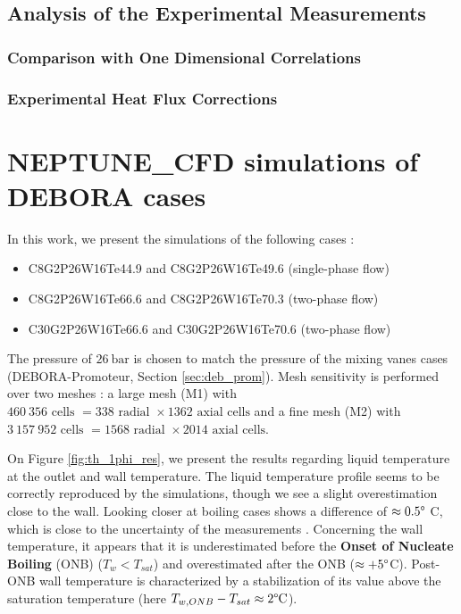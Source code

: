 \section{Analysis of the Experimental Measurements}

\subsection{Comparison with One Dimensional Correlations}

\subsection{Experimental Heat Flux Corrections}

\chapter{NEPTUNE\_CFD simulations of DEBORA cases}

In this work, we present the simulations of the following cases :
\begin{itemize}
\item C8G2P26W16Te44.9 and C8G2P26W16Te49.6 (single-phase flow)
\item C8G2P26W16Te66.6 and C8G2P26W16Te70.3 (two-phase flow)
\item C30G2P26W16Te66.6 and C30G2P26W16Te70.6 (two-phase flow)
\end{itemize}

The pressure of $26~\text{bar}$ is chosen to match the pressure of the mixing vanes cases (DEBORA-Promoteur, Section \ref{sec:deb_prom}). Mesh sensitivity is performed over two meshes : a large mesh (M1) with $460~356\text{ cells }=338\text{ radial } \times 1362 \text{ axial cells}$ and a fine mesh (M2) with $3~157~952\text{ cells }=1568\text{ radial } \times 2014 \text{ axial cells}$.

On Figure \ref{fig:th_1phi_res}, we present the results regarding liquid temperature at the outlet and wall temperature. The liquid temperature profile seems to be correctly reproduced by the simulations, though we see a slight overestimation close to the wall. Looking closer at boiling cases shows a difference of $\approx 0.5\degree$ C, which is close to the uncertainty of the measurements \cite{Garnier2001}. Concerning the wall temperature, it appears that it is underestimated before the \textbf{Onset of Nucleate Boiling} (ONB) ($T_{w}<T_{sat}$) and overestimated after the ONB ($\approx +5\degree$C). Post-ONB wall temperature is characterized by a stabilization of its value above the saturation temperature (here $T_{w,ONB}-T_{sat}\approx 2\degree\text{C}$).

